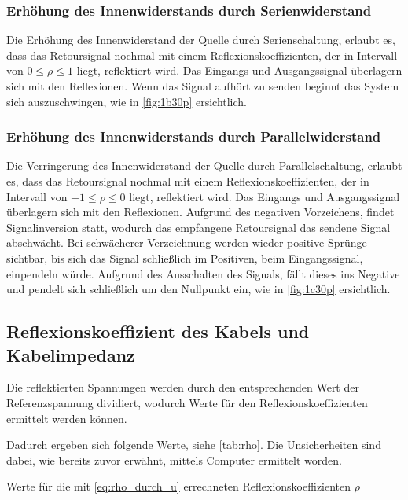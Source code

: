 \documentclass[11pt,ngerman]{scrartcl}
\begin{document}
\subsubsection{Erhöhung des Innenwiderstands durch Serienwiderstand}

Die Erhöhung des Innenwiderstand der Quelle durch Serienschaltung, erlaubt es,
dass das Retoursignal nochmal mit einem Reflexionskoeffizienten, der in
Intervall von $0 \leq \rho \leq 1$ liegt, reflektiert wird. Das Eingangs und
Ausgangssignal überlagern sich mit den Reflexionen. Wenn das Signal aufhört zu
senden beginnt das System sich auszuschwingen, wie in \autoref{fig:1b30p}
ersichtlich.

\subsubsection{Erhöhung des Innenwiderstands durch Parallelwiderstand}

Die Verringerung des Innenwiderstand der Quelle durch Parallelschaltung,
erlaubt es, dass das Retoursignal nochmal mit einem Reflexionskoeffizienten,
der in Intervall von $-1 \leq \rho \leq 0$ liegt, reflektiert wird. Das
Eingangs und Ausgangssignal überlagern sich mit den Reflexionen. Aufgrund des
negativen Vorzeichens, findet Signalinversion statt, wodurch das empfangene
Retoursignal das sendene Signal abschwächt. Bei schwächerer Verzeichnung werden
wieder positive Sprünge sichtbar, bis sich das Signal schließlich im Positiven,
beim Eingangssignal, einpendeln würde. Aufgrund des Ausschalten des Signals,
fällt dieses ins Negative und pendelt sich schließlich um den Nullpunkt ein,
wie in \autoref{fig:1c30p} ersichtlich.

\subsection{Reflexionskoeffizient des Kabels und Kabelimpedanz}

Die reflektierten Spannungen werden durch den entsprechenden Wert der
Referenzspannung dividiert, wodurch Werte für den Reflexionskoeffizienten
ermittelt werden können.

\noindent Dadurch ergeben sich folgende Werte, siehe \autoref{tab:rho}. Die Unsicherheiten sind dabei, wie
bereits zuvor erwähnt, mittels Computer ermittelt worden.

\begin{table}[H]
	\caption{Werte für die mit \autoref{eq:rho_durch_u} errechneten Reflexionskoeffizienten $\rho$ }
	\label{tab:rho}
	\begin{center}
		
	\end{center}
\end{table}
\end{document}
